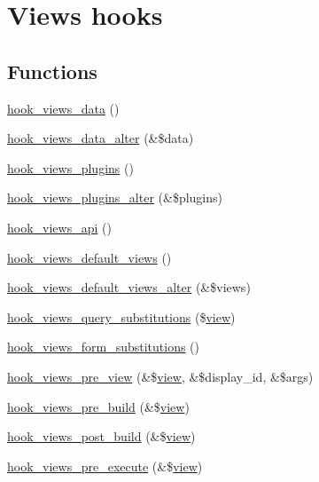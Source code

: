 \hypertarget{group__views__hooks}{
\section{Views hooks}
\label{group__views__hooks}
}
\subsection*{Functions}
\begin{DoxyCompactItemize}
\item 
\hyperlink{group__views__hooks_ga227057901681e4a33e33c199c7a8c989}{hook\_\-views\_\-data} ()
\item 
\hyperlink{group__views__hooks_ga6ae0bb0d2385e03c32b57625b6d35826}{hook\_\-views\_\-data\_\-alter} (\&\$data)
\item 
\hyperlink{group__views__hooks_ga23f6e9972b2ed84fc54b7ff63f44477d}{hook\_\-views\_\-plugins} ()
\item 
\hyperlink{group__views__hooks_ga6c4e4c2a769b0017bf0edcd0adae57e9}{hook\_\-views\_\-plugins\_\-alter} (\&\$plugins)
\item 
\hyperlink{group__views__hooks_gac67ffd4a2f61f9814ee37b541c472c47}{hook\_\-views\_\-api} ()
\item 
\hyperlink{group__views__hooks_ga23edb74860682fa88f75cf94b97c2e15}{hook\_\-views\_\-default\_\-views} ()
\item 
\hyperlink{group__views__hooks_gacd31035a6ae9c7baf05ad034d6a65768}{hook\_\-views\_\-default\_\-views\_\-alter} (\&\$views)
\item 
\hyperlink{group__views__hooks_gac3628ab1f08eee5a2bd9c3c4b5bd4c3b}{hook\_\-views\_\-query\_\-substitutions} (\$\hyperlink{classview}{view})
\item 
\hyperlink{group__views__hooks_gaf51ae4253a5a2215dbf8dc56d8be7e60}{hook\_\-views\_\-form\_\-substitutions} ()
\item 
\hyperlink{group__views__hooks_ga471b90caa886a4e4239a839d6bf7a963}{hook\_\-views\_\-pre\_\-view} (\&\$\hyperlink{classview}{view}, \&\$display\_\-id, \&\$args)
\item 
\hyperlink{group__views__hooks_ga1c3fc52e2854310f84eeb43b98a0ba64}{hook\_\-views\_\-pre\_\-build} (\&\$\hyperlink{classview}{view})
\item 
\hyperlink{group__views__hooks_ga1c869865c1fafafcfb8a31a1fbc5c135}{hook\_\-views\_\-post\_\-build} (\&\$\hyperlink{classview}{view})
\item 
\hyperlink{group__views__hooks_gaf7582b210bdd367d6006c7dc62304475}{hook\_\-views\_\-pre\_\-execute} (\&\$\hyperlink{classview}{view})

\end{DoxyCompactItemize}

